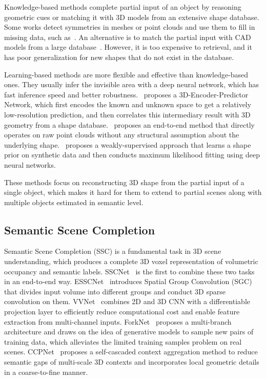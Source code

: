 \documentclass[10pt,twocolumn,letterpaper]{article}
\begin{document}
Knowledge-based methods complete partial input of an object by reasoning geometric cues or matching it with 3D models from an extensive shape database. Some works detect symmetries in meshes or point clouds and use them to fill in missing data, such as~\cite{thrun2005shape,speciale2016symmetry,pauly2008discovering}.
An alternative is to match the partial input with CAD models from a large database~\cite{nan2012search,shao2012interactive,kim2012acquiring}. However, it is too expensive to retrieval, and it has poor generalization for new shapes that do not exist in the database.

Learning-based methods are more flexible and effective than knowledge-based ones. They usually infer the invisible area with a deep neural network, which has fast inference speed and better robustness.~\cite{dai2017shape} proposes a 3D-Encoder-Predictor Network, which first encodes the known and unknown space to get a relatively low-resolution prediction, and then correlates this intermediary result with 3D geometry from a shape database.~\cite{yuan2018pcn} proposes an end-to-end method that directly operates on raw point clouds without any structural assumption about the underlying shape.~\cite{stutz2018learning} proposes a weakly-supervised approach that learns a shape prior on synthetic data and then conducts maximum likelihood fitting using deep neural networks.

These methods focus on reconstructing 3D shape from the partial input of a single object, which makes it hard for them to extend to partial scenes along with multiple objects estimated in semantic level.

\subsection{Semantic Scene Completion}
Semantic Scene Completion (SSC) is a fundamental task in 3D scene understanding, which produces a complete 3D voxel representation of volumetric occupancy and semantic labels. SSCNet~\cite{song2017semantic-sscnet} is the first to combine these two tasks in an end-to-end way. ESSCNet~\cite{zhang2018efficient-esscnet} introduces Spatial Group Convolution (SGC) that divides input volume into different groups and conduct 3D sparse convolution on them. VVNet~\cite{guo2018view-vvnet} combines 2D and 3D CNN with a differentiable projection layer to efficiently reduce computational cost and enable feature extraction from multi-channel inputs. ForkNet~\cite{wang2019forknet} proposes a multi-branch architecture and draws on the idea of generative models to sample new pairs of training data, which alleviates the limited training samples problem on real scenes. CCPNet~\cite{zhang2019cascaded-ccpnet} proposes a self-cascaded context aggregation method to reduce semantic gaps of multi-scale 3D contexts and incorporates local geometric details in a coarse-to-fine manner. 
\end{document}
